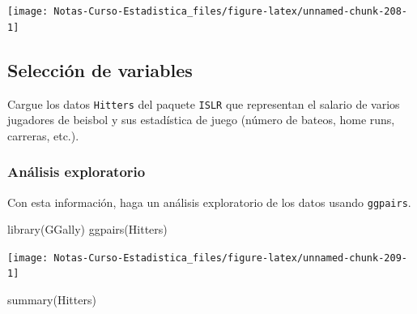 \documentclass[
  12pt,
]{book}
\newenvironment{Shaded}{\begin{snugshade}}{\end{snugshade}}
\newcommand{\FunctionTok}[1]{\textcolor[rgb]{0.00,0.00,0.00}{#1}}
\newcommand{\NormalTok}[1]{#1}
\theoremstyle{definition}
\theoremstyle{definition}
\theoremstyle{definition}
\theoremstyle{definition}
\theoremstyle{remark}
\begin{document}
\begin{center}\texttt{[image: Notas-Curso-Estadistica\_files/figure-latex/unnamed-chunk-208-1]} \end{center}

\hypertarget{selecciuxf3n-de-variables-1}{%
\subsection{Selección de variables}\label{selecciuxf3n-de-variables-1}}

Cargue los datos \texttt{Hitters} del paquete \texttt{ISLR} que representan el salario de varios jugadores de beisbol y sus estadística de juego (número de bateos, home runs, carreras, etc.).

\hypertarget{anuxe1lisis-exploratorio}{%
\subsubsection{Análisis exploratorio}\label{anuxe1lisis-exploratorio}}

Con esta información, haga un análisis exploratorio de los datos usando \texttt{ggpairs}.

\begin{Shaded}
\begin{Highlighting}[]
\FunctionTok{library}\NormalTok{(GGally)}
\FunctionTok{ggpairs}\NormalTok{(Hitters)}
\end{Highlighting}
\end{Shaded}

\begin{center}\texttt{[image: Notas-Curso-Estadistica\_files/figure-latex/unnamed-chunk-209-1]} \end{center}

\begin{Shaded}
\begin{Highlighting}[]
\FunctionTok{summary}\NormalTok{(Hitters)}
\end{Highlighting}
\end{Shaded}
\end{document}
